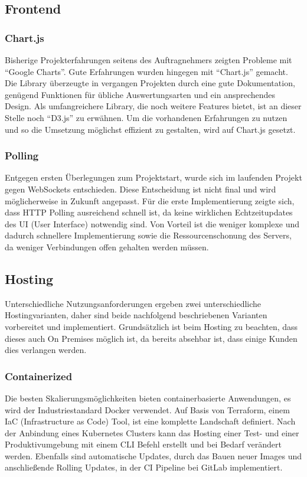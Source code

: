 \subsection{Frontend}

\subsubsection{Chart.js}
Bisherige Projekterfahrungen seitens des Auftragnehmers zeigten Probleme mit \enquote{Google Charts}.
Gute Erfahrungen wurden hingegen mit \enquote{Chart.js} gemacht.
Die Library überzeugte in vergangen Projekten durch eine gute Dokumentation, genügend Funktionen für übliche Auswertungsarten und ein ansprechendes Design.
Als umfangreichere Library, die noch weitere Features bietet, ist an dieser Stelle noch \enquote{D3.js} zu erwähnen.
Um die vorhandenen Erfahrungen zu nutzen und so die Umsetzung möglichst effizient zu gestalten, wird auf Chart.js gesetzt.

\subsubsection{Polling}
Entgegen ersten Überlegungen zum Projektstart, wurde sich im laufenden Projekt gegen WebSockets entschieden.
Diese Entscheidung ist nicht final und wird möglicherweise in Zukunft angepasst.
Für die erste Implementierung zeigte sich, dass HTTP Polling ausreichend schnell ist, da keine wirklichen Echtzeitupdates des UI (User Interface) notwendig sind.
Von Vorteil ist die weniger komplexe und dadurch schnellere Implementierung sowie die Ressourcenschonung des Servers, da weniger Verbindungen offen gehalten werden müssen.

\subsection{Hosting}
Unterschiedliche Nutzungsanforderungen ergeben zwei unterschiedliche Hostingvarianten, daher sind beide nachfolgend beschriebenen Varianten vorbereitet und implementiert.
Grundsätzlich ist beim Hosting zu beachten, dass dieses auch On Premises möglich ist, da bereits absehbar ist, dass einige Kunden dies verlangen werden.

\subsubsection{Containerized}
Die besten Skalierungsmöglichkeiten bieten containerbasierte Anwendungen, es wird der Industriestandard Docker verwendet.
Auf Basis von Terraform, einem IaC (Infrastructure as Code) Tool, ist eine komplette Landschaft definiert.
Nach der Anbindung eines Kubernetes Clusters kann das Hosting einer Test- und einer Produktivumgebung mit einem CLI Befehl erstellt und bei Bedarf verändert werden.
Ebenfalls sind automatische Updates, durch das Bauen neuer Images und anschließende Rolling Updates, in der CI Pipeline bei GitLab implementiert.

